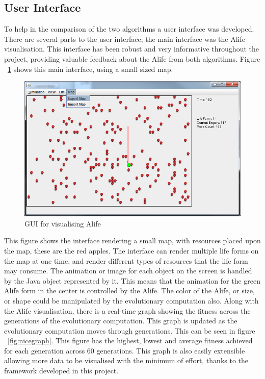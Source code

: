 \documentclass[12pt]{article}
\begin{document}
\subsection{User Interface}
To help in the comparison of the two algorithms a user interface was developed. There are several parts to the user interface; the main
interface was the Alife visualisation. This interface has been robust and very informative throughout the project, providing valuable
feedback about the Alife from both algorithms. Figure ~\ref{fig:interface1} shows this main interface, using a small sized map.

\begin{figure} [ht]
\centering
\includegraphics[scale = 0.45]{smallvis.png}
\caption{GUI for visualising Alife}
\label{fig:interface1}
\end{figure}

This figure shows the interface rendering a small map, with resources placed upon the map, these are the red apples. The interface can
render multiple life forms on the map at one time, and render different types of resources that the life form may consume. The animation
or image for each object on the screen is handled by the Java object represented by it. This means that the animation for the green
Alife form in the center is controlled by the Alife. The color of the Alife, or size, or shape could be manipulated by the evolutionary
computation also. Along with the Alife visualisation, there is a real-time graph showing the fitness  across the generations of the 
evolutionary computation. This graph is updated as the evolutionary computation moves through generations. This can be seen in figure
~\ref{fig:nicegraph}. This figure has the highest, lowest and average fitness achieved for each generation across 60 generations. This
graph is also easily extensible allowing more data to be visualised with the minimum of effort, thanks to the framework developed in
this project.
\end{document}
